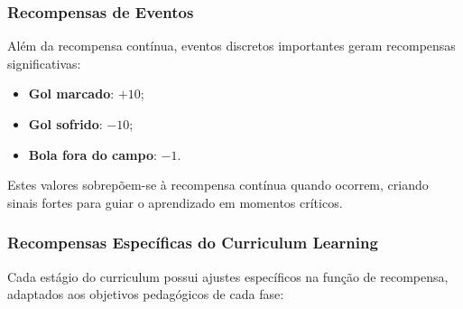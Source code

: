 \subsubsection{Recompensas de Eventos}

Além da recompensa contínua, eventos discretos importantes geram recompensas significativas:

\begin{itemize}
    \item \textbf{Gol marcado}: $+10$;
    \item \textbf{Gol sofrido}: $-10$;
    \item \textbf{Bola fora do campo}: $-1$.
\end{itemize}

Estes valores sobrepõem-se à recompensa contínua quando ocorrem, criando sinais fortes para guiar o aprendizado em momentos críticos.

\subsubsection{Recompensas Específicas do Curriculum Learning}

Cada estágio do curriculum possui ajustes específicos na função de recompensa, adaptados aos objetivos pedagógicos de cada fase:

